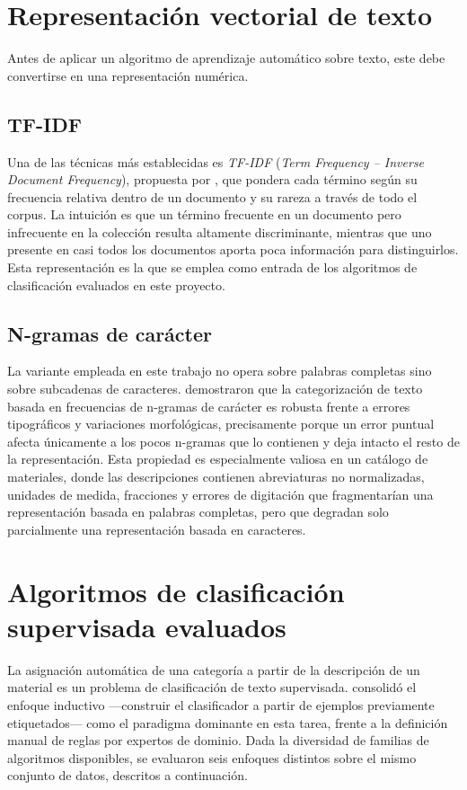 \section{Representación vectorial de texto}
Antes de aplicar un algoritmo de aprendizaje automático sobre texto, este debe convertirse en una representación numérica.

\subsection{TF-IDF}
Una de las técnicas más establecidas es \textit{TF-IDF} (\textit{Term Frequency – Inverse Document Frequency}), propuesta por , que pondera cada término según su frecuencia relativa dentro de un documento y su rareza a través de todo el corpus. La intuición es que un término frecuente en un documento pero infrecuente en la colección resulta altamente discriminante, mientras que uno presente en casi todos los documentos aporta poca información para distinguirlos. Esta representación es la que se emplea como entrada de los algoritmos de clasificación evaluados en este proyecto.

\subsection{N-gramas de carácter}
La variante empleada en este trabajo no opera sobre palabras completas sino sobre subcadenas de caracteres.  demostraron que la categorización de texto basada en frecuencias de n-gramas de carácter es robusta frente a errores tipográficos y variaciones morfológicas, precisamente porque un error puntual afecta únicamente a los pocos n-gramas que lo contienen y deja intacto el resto de la representación. Esta propiedad es especialmente valiosa en un catálogo de materiales, donde las descripciones contienen abreviaturas no normalizadas, unidades de medida, fracciones y errores de digitación que fragmentarían una representación basada en palabras completas, pero que degradan solo parcialmente una representación basada en caracteres.

\section{Algoritmos de clasificación supervisada evaluados}
La asignación automática de una categoría a partir de la descripción de un material es un problema de clasificación de texto supervisada.  consolidó el enfoque inductivo —construir el clasificador a partir de ejemplos previamente etiquetados— como el paradigma dominante en esta tarea, frente a la definición manual de reglas por expertos de dominio. Dada la diversidad de familias de algoritmos disponibles, se evaluaron seis enfoques distintos sobre el mismo conjunto de datos, descritos a continuación.

